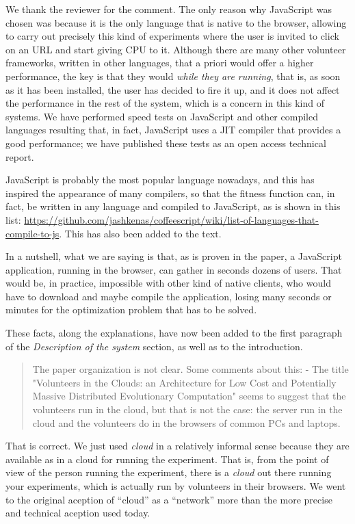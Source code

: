 \documentclass[preprint]{elsarticle}
\begin{document}
We thank the reviewer for the comment. The only reason why JavaScript
was chosen was because it is the only language that is native to the
browser, allowing to carry out precisely this kind of experiments
where the user is invited to click on an URL and start giving CPU to
it. Although there are many other volunteer frameworks, written in
other languages, that a priori would offer a higher performance, the
key is that they would {\em while they are running}, that is, as soon
as it has been installed, the user has decided to fire it up, and it
does not affect the performance in the rest of the system, which is a
concern in this kind of systems. We have performed speed tests on
JavaScript and other compiled languages resulting that, in fact,
JavaScript uses a JIT compiler that provides a good performance; we
have published these tests as an open access technical report.  %

JavaScript is probably the most popular language nowadays, and this
has inspired the appearance of many compilers, so that the fitness
function can, in fact, be written in any language and compiled to
JavaScript, as is shown in this list:
\url{https://github.com/jashkenas/coffeescript/wiki/list-of-languages-that-compile-to-js}. This
has also been added to the text.

In a nutshell, what we are saying is that, as is proven in the paper,
a JavaScript application, running in the browser, can gather in
seconds dozens of users. That would be, in practice, impossible with
other kind of native clients, who would have to download and maybe
compile the application, losing many seconds or minutes for the
optimization problem that has to be solved.

These facts, along the explanations, have now been added to the first
paragraph of the {\em Description of the system} section, as well as
to the introduction.

\begin{quote}
The paper organization is not clear. Some comments about this:
- The title "Volunteers in the Clouds: an Architecture for Low Cost and Potentially Massive Distributed
Evolutionary Computation" seems to suggest that the volunteers run in the cloud, but that is not the case:
the server run in the cloud and the volunteers do in the browsers of
common PCs and laptops.
\end{quote}

That is correct. We just used {\em cloud} in a relatively informal
sense because they are available as in a cloud for running the
experiment. That is, from the point of view of the person running the
experiment, there is a {\em cloud} out there running your experiments,
which is actually run by volunteers in their browsers. We went to the
original aception of ``cloud'' as a ``network'' more than the more
precise and technical aception used today. 
\end{document}
